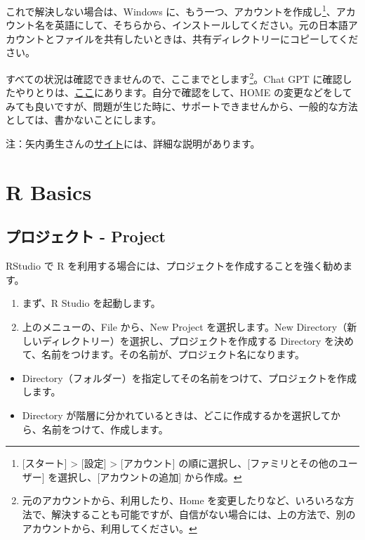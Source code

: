 \documentclass[
  xelatex, ja=standard]{bxjsbook}
\providecommand{\tightlist}{%
  \setlength{\itemsep}{0pt}\setlength{\parskip}{0pt}}
\theoremstyle{definition}
\theoremstyle{definition}
\theoremstyle{definition}
\theoremstyle{definition}
\theoremstyle{remark}
\begin{document}
これで解決しない場合は、Windows に、もう一つ、アカウントを作成し\footnote{{[}スタート{]} \textgreater{} {[}設定{]} \textgreater{} {[}アカウント{]} の順に選択し、{[}ファミリとその他のユーザー{]} を選択し、{[}アカウントの追加{]} から作成。}、アカウント名を英語にして、そちらから、インストールしてください。元の日本語アカウントとファイルを共有したいときは、共有ディレクトリーにコピーしてください。

すべての状況は確認できませんので、ここまでとします\footnote{元のアカウントから、利用したり、Home を変更したりなど、いろいろな方法で、解決することも可能ですが、自信がない場合には、上の方法で、別のアカウントから、利用してください。}。Chat GPT に確認したやりとりは、\href{https://icu-hsuzuki.github.io/ds_education/chatgpt.html\#chatgpt}{ここ}にあります。自分で確認をして、HOME の変更などをしてみても良いですが、問題が生じた時に、サポートできませんから、一般的な方法としては、書かないことにします。

注：矢内勇生さんの\href{https://yukiyanai.github.io/jp/resources/docs/install-R_windows.pdf}{サイト}には、詳細な説明があります。

\hypertarget{rbasics}{%
\chapter{R Basics}\label{rbasics}}

\hypertarget{ux30d7ux30edux30b8ux30a7ux30afux30c8---project}{%
\section{プロジェクト - Project}\label{ux30d7ux30edux30b8ux30a7ux30afux30c8---project}}

RStudio で R を利用する場合には、プロジェクトを作成することを強く勧めます。

\begin{enumerate}
\def\labelenumi{\arabic{enumi}.}
\item
  まず、R Studio を起動します。
\item
  上のメニューの、File から、New Project を選択します。New Directory（新しいディレクトリー）を選択し、プロジェクトを作成する Directory を決めて、名前をつけます。その名前が、プロジェクト名になります。
\end{enumerate}

\begin{itemize}
\tightlist
\item
  Directory（フォルダー）を指定してその名前をつけて、プロジェクトを作成します。
\item
  Directory が階層に分かれているときは、どこに作成するかを選択してから、名前をつけて、作成します。
\end{itemize}
\end{document}
